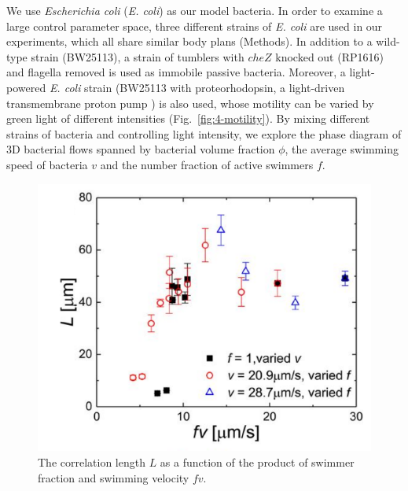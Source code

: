We use \textit{Escherichia coli} (\textit{E. coli}) as our model bacteria. In order to examine a large control parameter space, three different strains of \textit{E. coli} are used in our experiments, which all share similar body plans (Methods). In addition to a wild-type strain (BW25113), a strain of tumblers with $cheZ$ knocked out (RP1616) and flagella removed is used as immobile passive bacteria. Moreover, a light-powered
\textit{E. coli} strain (BW25113 with proteorhodopsin, a light-driven transmembrane proton pump \cite{Walter2007}) is also used, whose motility can be varied by green light of different intensities (Fig.~\ref{fig:4-motility}). By mixing different strains of bacteria and controlling light intensity, we explore the phase diagram of 3D bacterial flows spanned by bacterial volume fraction $\phi$, the average swimming speed of bacteria $v$ and the number fraction of active swimmers $f$.

\begin{figure}[!ht]
	\begin{center}
	\includegraphics[width=4 in]{Figs/4-Emergence/S2C.pdf}
	\end{center}
	\caption[The correlation length as a function of the product of swimmer fraction and swimming velocity]
	{
	The correlation length $L$ as a function of the product of swimmer fraction and swimming velocity $fv$.
  }
	\label{fig:4-correlation-length}
\end{figure}

